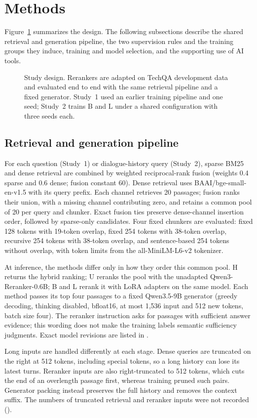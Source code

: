 \section{Methods}\label{sec:pipeline}
Figure~\ref{fig:design} summarizes the design. The following subsections describe the shared retrieval and generation pipeline, the two supervision rules and the training groups they induce, training and model selection, and the supporting use of AI tools.
\begin{figure}[htbp]\centering

\caption{Study design. Rerankers are adapted on TechQA development data and evaluated end to end with the same retrieval pipeline and a fixed generator. Study~1 used an earlier training pipeline and one seed; Study~2 trains B and L under a shared configuration with three seeds each.}\label{fig:design}
\end{figure}
\subsection{Retrieval and generation pipeline}
For each question (Study~1) or dialogue-history query (Study~2), sparse BM25 and dense retrieval are combined by weighted reciprocal-rank fusion (weights 0.4 sparse and 0.6 dense; fusion constant 60). Dense retrieval uses BAAI/bge-small-en-v1.5 with its query prefix. Each channel retrieves 20 passages; fusion ranks their union, with a missing channel contributing zero, and retains a common pool of 20 per query and chunker. Exact fusion ties preserve dense-channel insertion order, followed by sparse-only candidates. Four fixed chunkers are evaluated: fixed 128 tokens with 19-token overlap, fixed 254 tokens with 38-token overlap, recursive 254 tokens with 38-token overlap, and sentence-based 254 tokens without overlap, with token limits from the all-MiniLM-L6-v2 tokenizer.

At inference, the methods differ only in how they order this common pool. H returns the hybrid ranking; U reranks the pool with the unadapted Qwen3-Reranker-0.6B; B and L rerank it with LoRA adapters on the same model. Each method passes its top four passages to a fixed Qwen3.5-9B generator (greedy decoding, thinking disabled, bfloat16, at most 1,536 input and 512 new tokens, batch size four). The reranker instruction asks for passages with sufficient answer evidence; this wording does not make the training labels semantic sufficiency judgments. Exact model revisions are listed in .

Long inputs are handled differently at each stage. Dense queries are truncated on the right at 512 tokens, including special tokens, so a long history can lose its latest turns. Reranker inputs are also right-truncated to 512 tokens, which cuts the end of an overlength passage first, whereas training pruned such pairs. Generator packing instead preserves the full history and removes the context suffix. The numbers of truncated retrieval and reranker inputs were not recorded ().

